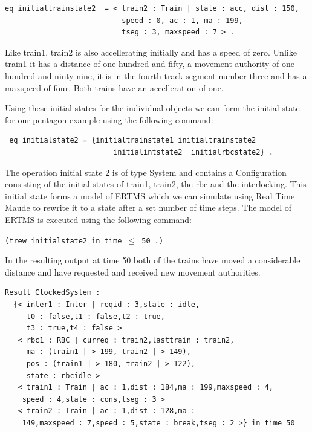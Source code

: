 \begin{lstlisting}[caption = The intial state of train2 in Maude]
eq initialtrainstate2  = < train2 : Train | state : acc, dist : 150, 
                           speed : 0, ac : 1, ma : 199,
                           tseg : 3, maxspeed : 7 > .
\end{lstlisting}
Like train1, train2 is also accellerating initially and has a speed of zero.  Unlike train1 it has a distance of one hundred and fifty, a movement authority of one hundred and ninty nine, it is in the fourth track segment number three and has a maxspeed of four. Both trains have an accelleration of one. 

Using these initial states for the individual objects we can form the initial state for our pentagon example using the following command:
\begin{lstlisting}
 eq initialstate2 = {initialtrainstate1 initialtrainstate2 
                         initialintstate2  initialrbcstate2} . 
\end{lstlisting}
The operation initial state 2 is of type System and contains a Configuration consisting of the initial states of train1, train2, the rbc and the interlocking. This initial state forms a model of ERTMS which we can simulate using Real Time Maude to rewrite it to a state after a set number of time steps. The model of ERTMS is executed using the following command:
\begin{center}
\texttt{(trew initialstate2 in time $\leq$ 50 .)}
\end{center}

In the resulting output at time 50 both of the trains have moved a considerable distance and have requested and received new movement authorities.
 
\begin{lstlisting}[caption = The result of rewriting initialstate2 for 50 time steps]
Result ClockedSystem :
  {< inter1 : Inter | reqid : 3,state : idle,
     t0 : false,t1 : false,t2 : true,
     t3 : true,t4 : false > 
   < rbc1 : RBC | curreq : train2,lasttrain : train2,
     ma : (train1 |-> 199, train2 |-> 149),
     pos : (train1 |-> 180, train2 |-> 122),
     state : rbcidle > 
   < train1 : Train | ac : 1,dist : 184,ma : 199,maxspeed : 4,
    speed : 4,state : cons,tseg : 3 > 
   < train2 : Train | ac : 1,dist : 128,ma :
    149,maxspeed : 7,speed : 5,state : break,tseg : 2 >} in time 50
\end{lstlisting}

